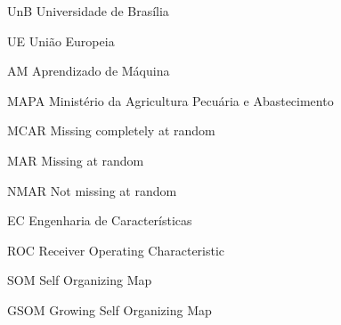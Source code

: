 \begin{siglas}
  \item[UnB] Universidade de Brasília
 	\item[UE] União Europeia
	\item[AM] Aprendizado de Máquina
	\item[MAPA] Ministério da Agricultura Pecuária e Abastecimento
	\item[MCAR] Missing completely at random
	\item[MAR] Missing at random
	\item[NMAR] Not missing at random
	\item[EC] Engenharia de Características
	\item[ROC] Receiver Operating Characteristic
	\item[SOM] Self Organizing Map
	\item[GSOM] Growing Self Organizing Map 
	\end{siglas}
